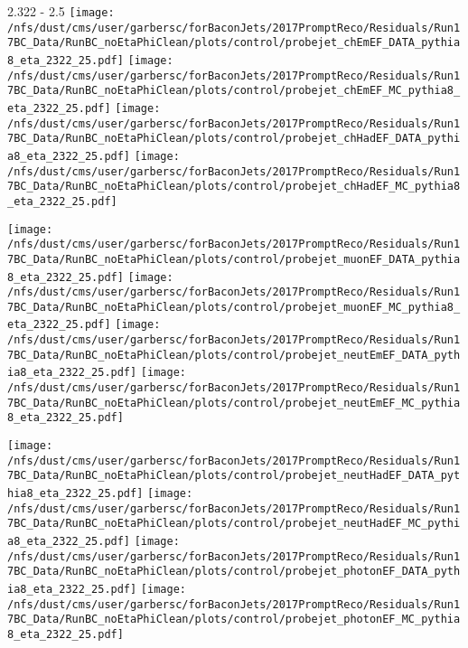 \documentclass[t,compress]{beamer}
\begin{document}
\begin{frame}{2.322 - 2.5}
	\texttt{[image: /nfs/dust/cms/user/garbersc/forBaconJets/2017PromptReco/Residuals/Run17BC\_Data/RunBC\_noEtaPhiClean/plots/control/probejet\_chEmEF\_DATA\_pythia8\_eta\_2322\_25.pdf]}
	\texttt{[image: /nfs/dust/cms/user/garbersc/forBaconJets/2017PromptReco/Residuals/Run17BC\_Data/RunBC\_noEtaPhiClean/plots/control/probejet\_chEmEF\_MC\_pythia8\_eta\_2322\_25.pdf]}
	\texttt{[image: /nfs/dust/cms/user/garbersc/forBaconJets/2017PromptReco/Residuals/Run17BC\_Data/RunBC\_noEtaPhiClean/plots/control/probejet\_chHadEF\_DATA\_pythia8\_eta\_2322\_25.pdf]}
	\texttt{[image: /nfs/dust/cms/user/garbersc/forBaconJets/2017PromptReco/Residuals/Run17BC\_Data/RunBC\_noEtaPhiClean/plots/control/probejet\_chHadEF\_MC\_pythia8\_eta\_2322\_25.pdf]}
\newline

\vspace{-0.65cm}
	\texttt{[image: /nfs/dust/cms/user/garbersc/forBaconJets/2017PromptReco/Residuals/Run17BC\_Data/RunBC\_noEtaPhiClean/plots/control/probejet\_muonEF\_DATA\_pythia8\_eta\_2322\_25.pdf]}
	\texttt{[image: /nfs/dust/cms/user/garbersc/forBaconJets/2017PromptReco/Residuals/Run17BC\_Data/RunBC\_noEtaPhiClean/plots/control/probejet\_muonEF\_MC\_pythia8\_eta\_2322\_25.pdf]}
	\texttt{[image: /nfs/dust/cms/user/garbersc/forBaconJets/2017PromptReco/Residuals/Run17BC\_Data/RunBC\_noEtaPhiClean/plots/control/probejet\_neutEmEF\_DATA\_pythia8\_eta\_2322\_25.pdf]}
	\texttt{[image: /nfs/dust/cms/user/garbersc/forBaconJets/2017PromptReco/Residuals/Run17BC\_Data/RunBC\_noEtaPhiClean/plots/control/probejet\_neutEmEF\_MC\_pythia8\_eta\_2322\_25.pdf]}
\newline

\vspace{-0.65cm}
	\texttt{[image: /nfs/dust/cms/user/garbersc/forBaconJets/2017PromptReco/Residuals/Run17BC\_Data/RunBC\_noEtaPhiClean/plots/control/probejet\_neutHadEF\_DATA\_pythia8\_eta\_2322\_25.pdf]}
	\texttt{[image: /nfs/dust/cms/user/garbersc/forBaconJets/2017PromptReco/Residuals/Run17BC\_Data/RunBC\_noEtaPhiClean/plots/control/probejet\_neutHadEF\_MC\_pythia8\_eta\_2322\_25.pdf]}
	\texttt{[image: /nfs/dust/cms/user/garbersc/forBaconJets/2017PromptReco/Residuals/Run17BC\_Data/RunBC\_noEtaPhiClean/plots/control/probejet\_photonEF\_DATA\_pythia8\_eta\_2322\_25.pdf]}
	\texttt{[image: /nfs/dust/cms/user/garbersc/forBaconJets/2017PromptReco/Residuals/Run17BC\_Data/RunBC\_noEtaPhiClean/plots/control/probejet\_photonEF\_MC\_pythia8\_eta\_2322\_25.pdf]}
\end{frame}
\end{document}
